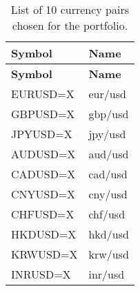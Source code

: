 \begin{longtable}{|l|l|}
\caption{List of 10 currency pairs chosen for the portfolio.}
\label{tab:currencies}
\\
\hline
\textbf{Symbol} & \textbf{Name}  \\ \midrule
\endfirsthead

\hline
\textbf{Symbol} & \textbf{Name} \\ \midrule
\endhead

\endfoot

\hline
EURUSD=X & \acrfull{eur}/\acrshort{usd} \\ \hline
GBPUSD=X & \acrfull{gbp}/\acrshort{usd} \\ \hline
JPYUSD=X & \acrfull{jpy}/\acrshort{usd} \\ \hline
AUDUSD=X & \acrfull{aud}/\acrshort{usd} \\ \hline
CADUSD=X & \acrfull{cad}/\acrshort{usd} \\ \hline
CNYUSD=X & \acrfull{cny}/\acrshort{usd} \\ \hline
CHFUSD=X & \acrfull{chf}/\acrshort{usd} \\ \hline
HKDUSD=X & \acrfull{hkd}/\acrshort{usd} \\ \hline
KRWUSD=X & \acrfull{krw}/\acrshort{usd} \\ \hline
INRUSD=X & \acrfull{inr}/\acrshort{usd} \\ \hline
\end{longtable}
